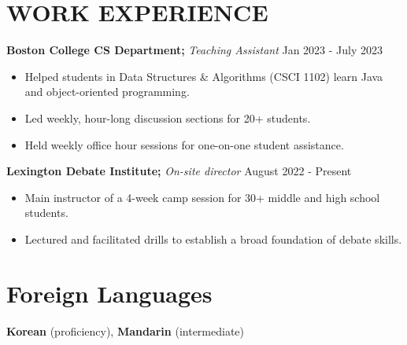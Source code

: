 \documentclass[11pt]{article}
\begin{document}
\section*{WORK EXPERIENCE}
\textbf{Boston College CS Department;} \textit{Teaching Assistant} \hfill Jan 2023 - July 2023 
\begin{itemize}[leftmargin=1.5em]
	\item Helped students in Data Structures \& Algorithms (CSCI 1102) learn Java and object-oriented programming. 
	\item Led weekly, hour-long discussion sections for 20+ students. 
	\item Held weekly office hour sessions for one-on-one student assistance.
\end{itemize}

\raggedright
\textbf{Lexington Debate Institute;} \textit{On-site director} \hfill August 2022 - Present \\
\begin{itemize}[leftmargin=1.5em]
	\item Main instructor of a 4-week camp session for 30+ middle and high school students. 
	\item Lectured and facilitated drills to establish a broad foundation of debate skills.
\end{itemize}

\section*{Foreign Languages}
\textbf{Korean} (proficiency), \textbf{Mandarin} (intermediate)
\end{document}
